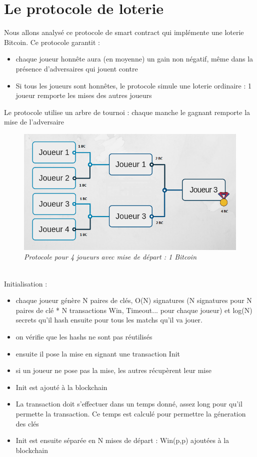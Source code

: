 \documentclass[conference]{IEEEtran}
\begin{document}
\section{Le protocole de loterie}
Nous allons analysé ce protocole de smart contract qui implémente une loterie Bitcoin. \cite{955}
Ce protocole garantit :
\begin{itemize}
\item chaque joueur honnête aura (en moyenne) un gain non négatif, même dans la
présence d'adversaires qui jouent contre 
\item Si tous les joueurs sont honnêtes, le protocole simule une loterie ordinaire : 1 joueur remporte les mises des autres joueurs 
\end{itemize}
Le protocole utilise un arbre de tournoi : chaque manche le gagnant remporte la mise de l'adversaire \\
\begin{figure}[!h]
    \centering
    \includegraphics[scale=0.35]{arbre-tournoi.png}
    \caption{\textit{Protocole pour 4 joueurs avec mise de départ : 1 Bitcoin}}
    \label{fig:my_label}
\end{figure}
\vspace{0.3cm}\\
Initialisation : \\
\begin{itemize}
\item chaque joueur génère N paires de clés, O(N) signatures (N signatures pour N paires de clé * N transactions Win, Timeout... pour chaque joueur) et log(N) secrets qu'il hash ensuite pour tous les matchs qu'il va jouer.
\item on vérifie que les hashs ne sont pas réutilisés
\item ensuite il pose la mise en signant une transaction Init
\item si un joueur ne pose pas la mise, les autres récupèrent leur mise
\item Init est ajouté à la blockchain
\item La transaction doit s'effectuer dans un temps donné, assez long pour qu'il permette la transaction. Ce temps est calculé pour permettre la géneration des clés 
\item Init est ensuite séparée en N mises de départ : Win(p,p) ajoutées à la blockchain \\
\end{itemize}
\\
\end{document}
